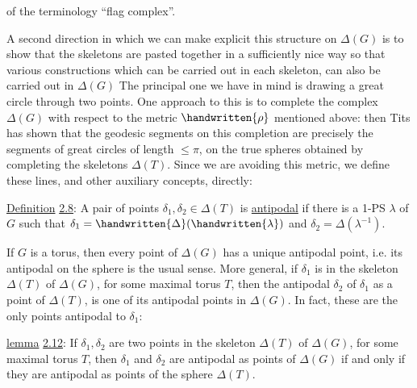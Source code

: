 
of the terminology ``flag complex''.

A second direction in which we can make explicit this structure on $\Delta(G)$ is to show that the skeletons are pasted together in a sufficiently nice way so that various constructions which can be carried out in each skeleton, can also be carried out in $\Delta(G)$ The principal one we have in mind is drawing a great circle through two points. One approach to this is to complete the complex $\Delta(G)$ with respect to the metric $\handwritten{\rho}$ mentioned above: then Tits has shown that the geodesic segments on this completion are precisely the segments of great circles of length $\leq\pi$, on the true spheres obtained by completing the skeletons $\Delta(T)$. Since we are avoiding this metric, we define these lines, and other auxiliary concepts, directly:

\uline{Definition} \uline{2.8}: A pair of points $\delta_1,\delta_2\in\Delta(T)$ is \uline{antipodal} if there is a 1-PS $\lambda$ of $G$ such that $\delta_1=\handwritten{\Delta}(\handwritten{\lambda})$ and $\delta_2=\Delta(\lambda^{-1})$.

If $G$ is a torus, then every point of $\Delta(G)$ has a unique antipodal point, i.e. its antipodal on the sphere is the usual sense. More general, if $\delta_1$ is in the skeleton $\Delta(T)$ of $\Delta(G)$, for some maximal torus $T$, then the antipodal $\delta_2$ of $\delta_1$ as a point of $\Delta(T)$, is one of its antipodal points in $\Delta(G)$. In fact, these are the only points antipodal to $\delta_1$:

\uline{lemma} \uline{2.12}: If $\delta_1,\delta_2$ are two points in the skeleton $\Delta(T)$ of $\Delta(G)$, for some maximal torus $T$, then $\delta_1$ and $\delta_2$ are antipodal as points of $\Delta(G)$ if and only if they are antipodal as points of the sphere $\Delta(T)$.
